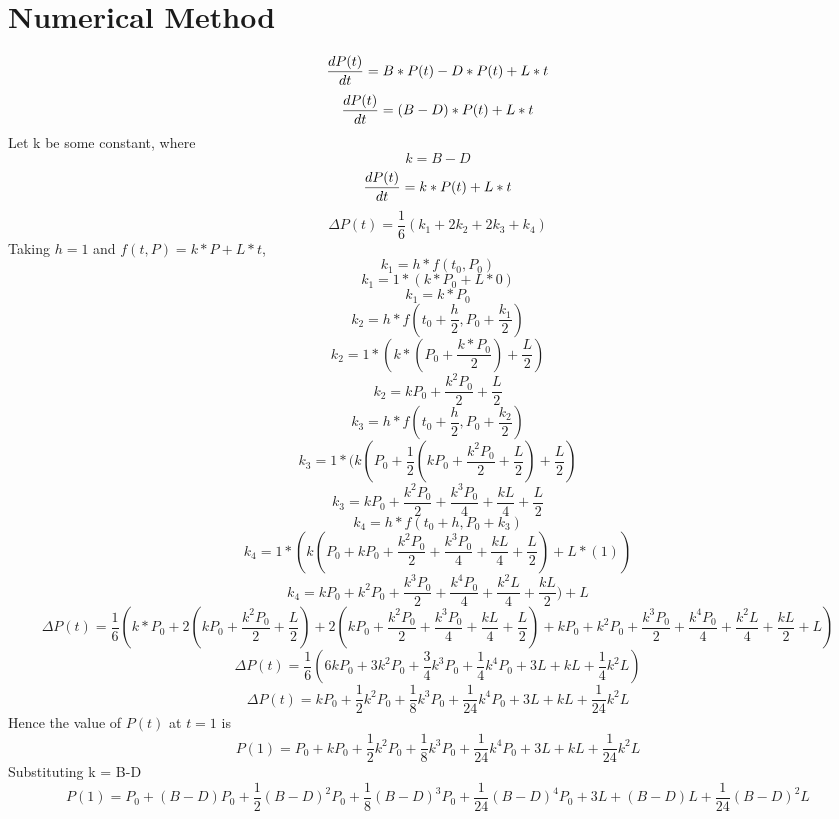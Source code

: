 \documentclass[a4paper]{article}
\begin{document}
\section*{Numerical Method}
$$
\frac{dP(t)}{dt}= B*P(t) - D*P(t) + L*t  \\
$$
$$
\frac{dP(t)}{dt}= (B-D)*P(t) + L*t \\
$$
Let k be some constant, where
$$
k=B-D 
$$
$$
\frac{dP(t)}{dt}= k*P(t) + L*t \\
$$
$$
\Delta P(t) = \frac{1}{6} (k_1 + 2k_2 + 2k_3 + k_4) 
$$
Taking $h=1$ and $f(t,P)=k*P + L*t$, 
$$
k_1 = h*f(t_0,P_0)
$$
$$
k_1 = 1* (k*P_0 + L * 0)
$$
$$
k_1 = k*P_0
$$
$$
k_2 = h * f(t_0+\frac{h}{2}, P_0 + \frac{k_1}{2})
$$
$$
k_2  = 1* ( k*(P_0+\frac{k*P_0}{2}) + \frac{L}{2})
$$
$$
k_2 = kP_0 + \frac{k^2P_0}{2} + \frac{L}{2}
$$
$$
k_3 = h * f(t_0+\frac{h}{2}, P_0 + \frac{k_2}{2})
$$
$$
k_3 = 1* (k(P_0+\frac{1}{2} ( kP_0 + \frac{k^2P_0}{2} + \frac{L}{2}) + \frac{L}{2})
$$
$$
k_3 = kP_0+\frac{k^2P_0}{2} + \frac{k^3P_0}{4} + \frac{kL}{4} + \frac{L}{2}
$$
$$
k_4 = h * f(t_0+h,P_0+k_3)
$$
$$
k_4 = 1 * (k(P_0+kP_0+\frac{k^2P_0}{2} + \frac{k^3P_0}{4} + \frac{kL}{4} + \frac{L}{2}) + L*(1))
$$
$$
k_4 = kP_0+k^2P_0+\frac{k^3P_0}{2} + \frac{k^4P_0}{4} + \frac{k^2L}{4} + \frac{kL}{2}) + L
$$
$$
\Delta P(t) = \frac{1}{6} (k*P_0 + 2(kP_0 + \frac{k^2P_0}{2} + \frac{L}{2}) + 2(kP_0+\frac{k^2P_0}{2} + \frac{k^3P_0}{4} + \frac{kL}{4} + \frac{L}{2}) + kP_0+k^2P_0+\frac{k^3P_0}{2} + \frac{k^4P_0}{4} + \frac{k^2L}{4} + \frac{kL}{2} + L) 
$$
$$
\Delta P(t) = \frac{1}{6} ( 6kP_0 + 3k^2P_0+\frac{3}{4}k^3P_0+\frac{1}{4}k^4P_0+3L+kL+\frac{1}{4}k^2L )
$$
$$
\Delta P(t) = kP_0 + \frac{1}{2}k^2P_0+\frac{1}{8}k^3P_0+\frac{1}{24}k^4P_0+3L+kL+\frac{1}{24}k^2L 
$$
Hence the value of $P(t)$ at $t=1$ is
$$
P(1) = P_0 +  kP_0 + \frac{1}{2}k^2P_0+\frac{1}{8}k^3P_0+\frac{1}{24}k^4P_0+3L+kL+\frac{1}{24}k^2L 
$$
Substituting k = B-D
$$
P(1) = P_0 +  (B-D)P_0 + \frac{1}{2}(B-D)^2P_0+\frac{1}{8}(B-D)^3P_0+\frac{1}{24}(B-D)^4P_0+3L+(B-D)L+\frac{1}{24}(B-D)^2L 
$$



\end{document}
